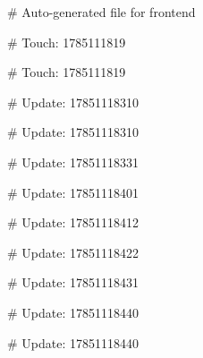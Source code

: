 # Auto-generated file for frontend

# Touch: 1785111819

# Touch: 1785111819

# Update: 17851118310

# Update: 17851118310

# Update: 17851118331

# Update: 17851118401

# Update: 17851118412

# Update: 17851118422

# Update: 17851118431

# Update: 17851118440

# Update: 17851118440
